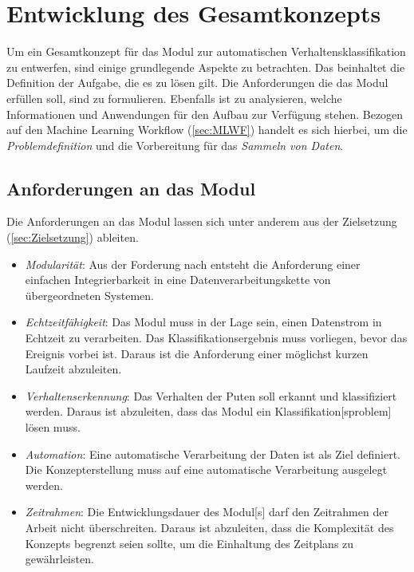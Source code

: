 \section{Entwicklung des Gesamtkonzepts} \label{sec:Meth gesamtkonzept}
Um ein Gesamtkonzept für das \gls{Modul} zur automatischen Verhaltensklassifikation zu entwerfen, sind einige grundlegende Aspekte zu betrachten. Das beinhaltet die Definition der Aufgabe, die es zu lösen gilt. Die Anforderungen die das \gls{Modul} erfüllen soll, sind zu formulieren. Ebenfalls ist zu analysieren, welche Informationen und Anwendungen für den Aufbau zur Verfügung stehen. Bezogen auf den \gls{Machine Learning Workflow} (\autoref{sec:MLWF}) handelt es sich hierbei, um die \textit{Problemdefinition} und die Vorbereitung für das \textit{Sammeln von Daten}. \par

\subsection{Anforderungen an das Modul} \label{sec:Meth Anforderungen}

Die Anforderungen an das \gls{Modul} lassen sich unter anderem aus der Zielsetzung (\autoref{sec:Zielsetzung}) ableiten. 

\begin{itemize}
    \item \textit{Modularität}: Aus der Forderung nach  entsteht die Anforderung einer einfachen Integrierbarkeit in eine Datenverarbeitungskette von übergeordneten Systemen.
    \item \textit{Echtzeitfähigkeit}: Das \gls{Modul} muss in der Lage sein, einen Datenstrom in Echtzeit zu verarbeiten. Das Klassifikationsergebnis muss vorliegen, bevor das Ereignis vorbei ist. Daraus ist die Anforderung einer möglichst kurzen Laufzeit abzuleiten.
    \item \textit{Verhaltenserkennung}: Das Verhalten der Puten soll erkannt und klassifiziert werden. Daraus ist abzuleiten, dass das \gls{Modul} ein \gls{Klassifikation}[sproblem] lösen muss.
    \item \textit{Automation}: Eine automatische Verarbeitung der Daten ist als Ziel definiert. Die Konzepterstellung muss auf eine automatische Verarbeitung ausgelegt werden. 
    \item \textit{Zeitrahmen}: Die Entwicklungsdauer des \gls{Modul}[s] darf den Zeitrahmen der Arbeit nicht überschreiten. Daraus ist abzuleiten, dass die Komplexität des Konzepts begrenzt seien sollte, um die Einhaltung des Zeitplans zu gewährleisten.
\end{itemize}



